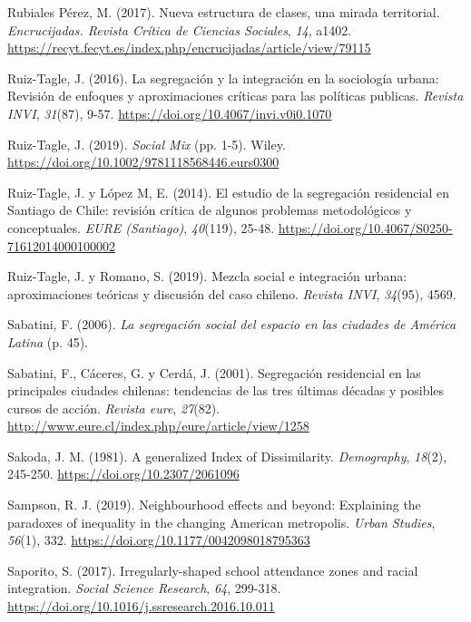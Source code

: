 \documentclass[
  spanish,
  a4paper,%
  chapterprefix=true,%
  DIV=calc,%
  twoside]{scrbook}%
\newlength{\cslhangindent}
\newenvironment{CSLReferences}[2] %
 {\begin{list}{}{%
  \setlength{\itemindent}{0pt}
  \setlength{\leftmargin}{0pt}
  \setlength{\parsep}{0pt}
  \ifodd #1
   \setlength{\leftmargin}{\cslhangindent}
   \setlength{\itemindent}{-1\cslhangindent}
  \fi
  \setlength{\itemsep}{#2\baselineskip}}}
 {\end{list}}
\begin{document}
\begin{CSLReferences}{1}{0}
Rubiales Pérez, M. (2017). Nueva estructura de clases, una mirada territorial. \emph{Encrucijadas. Revista Crítica de Ciencias Sociales}, \emph{14}, a1402. \url{https://recyt.fecyt.es/index.php/encrucijadas/article/view/79115}

Ruiz-Tagle, J. (2016). La segregación y la integración en la sociología urbana: Revisión de enfoques y aproximaciones críticas para las políticas publicas. \emph{Revista INVI}, \emph{31}(87), 9-57. \url{https://doi.org/10.4067/invi.v0i0.1070}

Ruiz-Tagle, J. (2019). \emph{Social Mix} (pp. 1-5). Wiley. \url{https://doi.org/10.1002/9781118568446.eurs0300}

Ruiz-Tagle, J. y López M, E. (2014). El estudio de la segregación residencial en Santiago de Chile: revisión crítica de algunos problemas metodológicos y conceptuales. \emph{EURE (Santiago)}, \emph{40}(119), 25-48. \url{https://doi.org/10.4067/S0250-71612014000100002}

Ruiz-Tagle, J. y Romano, S. (2019). Mezcla social e integración urbana: aproximaciones teóricas y discusión del caso chileno. \emph{Revista INVI}, \emph{34}(95), 4569.

Sabatini, F. (2006). \emph{La segregación social del espacio en las ciudades de América Latina} (p. 45).

Sabatini, F., Cáceres, G. y Cerdá, J. (2001). Segregación residencial en las principales ciudades chilenas: tendencias de las tres últimas décadas y posibles cursos de acción. \emph{Revista eure}, \emph{27}(82). \url{http://www.eure.cl/index.php/eure/article/view/1258}

Sakoda, J. M. (1981). A generalized Index of Dissimilarity. \emph{Demography}, \emph{18}(2), 245-250. \url{https://doi.org/10.2307/2061096}

Sampson, R. J. (2019). Neighbourhood effects and beyond: Explaining the paradoxes of inequality in the changing American metropolis. \emph{Urban Studies}, \emph{56}(1), 332. \url{https://doi.org/10.1177/0042098018795363}

Saporito, S. (2017). Irregularly-shaped school attendance zones and racial integration. \emph{Social Science Research}, \emph{64}, 299-318. \url{https://doi.org/10.1016/j.ssresearch.2016.10.011}


\end{CSLReferences}
\end{document}
